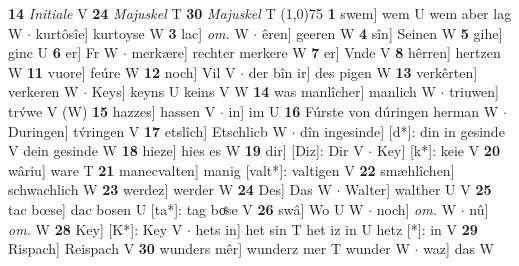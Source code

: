 \documentclass[8pt,a4paper,notitlepage]{article}
\begin{document}
\begin{table}[ht]
\begin{minipage}[t]{0.5\linewidth}
\textbf{14} \textit{Initiale} V  \textbf{24} \textit{Majuskel} T  \textbf{30} \textit{Majuskel} T  \newline
\line(1,0){75} \newline
\textbf{1} swem] wem U wem aber lag W  $\cdot$ kurtôsîe] kurtoyse W \textbf{3} lac] \textit{om.} W  $\cdot$ êren] geeren W \textbf{4} sîn] Seinen W \textbf{5} gihe] ginc U \textbf{6} er] Fr W  $\cdot$ merkære] rechter merkere W \textbf{7} er] Vnde V \textbf{8} hêrren] hertzen W \textbf{11} vuore] feúre W \textbf{12} noch] Vil V  $\cdot$ der bîn ir] des pigen W \textbf{13} verkêrten] verkeren W  $\cdot$ Keys] keyns U keins V W \textbf{14} was manlîcher] manlich W  $\cdot$ triuwen] trv́we V (W) \textbf{15} hazzes] hassen V  $\cdot$ in] im U \textbf{16} Fúrste von dúringen herman W  $\cdot$ Duringen] tv́ringen V \textbf{17} etslîch] Etschlicb W  $\cdot$ dîn ingesinde] [d*]: din in gesinde V dein gesinde W \textbf{18} hieze] hies es W \textbf{19} dir] [Diz]: Dir V  $\cdot$ Key] [k*]: keie V \textbf{20} wâriu] ware T \textbf{21} manecvalten] manig [valt*]: valtigen V \textbf{22} smæhlîchen] schwachlich W \textbf{23} werdez] werder W \textbf{24} Des] Das W  $\cdot$ Walter] walther U V \textbf{25} tac bœse] dac bosen U [ta*]: tag boͤse V \textbf{26} swâ] Wo U W  $\cdot$ noch] \textit{om.} W  $\cdot$ nû] \textit{om.} W \textbf{28} Key] [K*]: Key V  $\cdot$ hets in] het sin T het iz in U hetz [*]: in V \textbf{29} Rispach] Reispach V \textbf{30} wunders mêr] wunderz mer T wunder W  $\cdot$ waz] das W \newline
\end{minipage}
\end{table}
\end{document}

